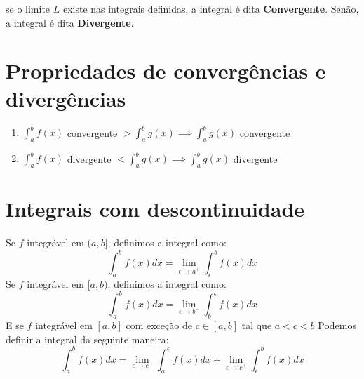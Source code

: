 se o limite \(L\) existe nas integrais definidas, a integral é dita \textbf{Convergente}. Senão, a integral é dita \textbf{Divergente}.


\section{Propriedades de convergências e divergências}

\begin{enumerate}
    \item \( \int_{a}^{b} f(x)\) convergente \(> \int_{a}^{b} g(x) \implies \int_{a}^{b} g(x)\) convergente
    \item \(\int_{a}^{b} f(x)\) divergente \(< \int_{a}^{b} g(x) \implies \int_{a}^{b} g(x)\) divergente
\end{enumerate}

\section{Integrais com descontinuidade}

Se \(f\) integrável em \((a, b]\), definimos a integral como:
\begin{equation}
    \int_{a}^{b} f(x)dx = \lim_{\epsilon \to a^{+} } \int_{\epsilon}^{b} f(x)dx
\end{equation}
Se \(f\) integrável em \([a,b)\), definimos a integral como:
\begin{equation}
    \int_{a}^{b} f(x)dx = \lim_{\epsilon \to b^{-} } \int_{b}^{\epsilon} f(x)dx
\end{equation}
E se \(f\) integrável em \([a, b]\) com exceção de \(c \in [a,b]\) tal que \(a < c < b\) Podemos definir a integral da seguinte maneira:
\begin{equation}
    \int_{a}^{b} f(x)dx = 
        \lim_{\epsilon \to c^{-} } \int_{a}^{\epsilon} f(x)dx +
        \lim_{\epsilon \to c^{+} } \int_{\epsilon}^{b} f(x)dx 
\end{equation}
